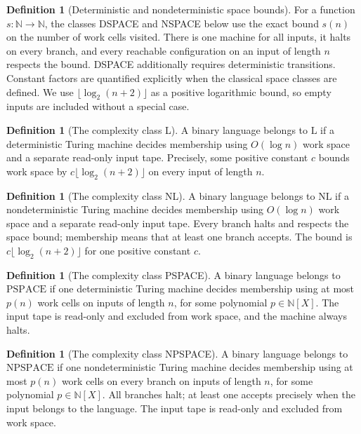 \documentclass[11pt]{article}
\theoremstyle{definition}
\newtheorem{definition}[theorem]{Definition}
\begin{document}
\begin{definition}[Deterministic and nondeterministic space bounds]\leavevmode
For a function $s:\mathbb{N}\to\mathbb{N}$, the classes DSPACE and NSPACE
below use the exact bound $s(n)$ on the number of work cells visited.
There is one machine for all inputs, it halts on every branch, and every
reachable configuration on an input of length $n$ respects the bound.
DSPACE additionally requires deterministic transitions. Constant factors
are quantified explicitly when the classical space classes are defined.
We use $\lfloor\log_2(n+2)\rfloor$ as a positive logarithmic bound, so
empty inputs are included without a special case.
\end{definition}

\begin{definition}[The complexity class L]\leavevmode
A binary language belongs to $\mathrm{L}$ if a deterministic Turing machine
decides membership using $O(\log n)$ work space and a separate read-only
input tape. Precisely, some positive constant $c$ bounds work space by
$c\lfloor\log_2(n+2)\rfloor$ on every input of length $n$.
\end{definition}

\begin{definition}[The complexity class NL]\leavevmode
A binary language belongs to $\mathrm{NL}$ if a nondeterministic Turing
machine decides membership using $O(\log n)$ work space and a separate
read-only input tape. Every branch halts and respects the space bound;
membership means that at least one branch accepts. The bound is
$c\lfloor\log_2(n+2)\rfloor$ for one positive constant $c$.
\end{definition}

\begin{definition}[The complexity class PSPACE]\leavevmode
A binary language belongs to $\mathrm{PSPACE}$ if one deterministic Turing
machine decides membership using at most $p(n)$ work cells on inputs of
length $n$, for some polynomial $p\in\mathbb{N}[X]$. The input tape is
read-only and excluded from work space, and the machine always halts.
\end{definition}

\begin{definition}[The complexity class NPSPACE]\leavevmode
A binary language belongs to $\mathrm{NPSPACE}$ if one nondeterministic
Turing machine decides membership using at most $p(n)$ work cells on
every branch on inputs of length $n$, for some polynomial
$p\in\mathbb{N}[X]$. All branches halt; at least one accepts precisely
when the input belongs to the language. The input tape is read-only and
excluded from work space.
\end{definition}
\end{document}
